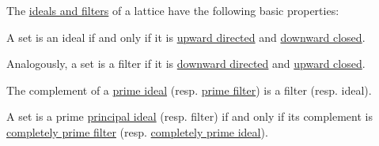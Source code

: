 \begin{proposition}\label{thm:def:lattice_ideal}
  The \hyperref[def:lattice_ideal]{ideals and filters} of a lattice have the following basic properties:
  \begin{thmenum}
     A set is an ideal if and only if it is \hyperref[def:directed_set]{upward directed} and \hyperref[def:closed_ordered_set]{downward closed}.

    Analogously, a set is a filter if it is \hyperref[def:directed_set]{downward directed} and \hyperref[def:closed_ordered_set]{upward closed}.

     The complement of a \hyperref[def:lattice_ideal/prime]{prime ideal} (resp. \hyperref[def:lattice_ideal/prime]{prime filter}) is a filter (resp. ideal).

     A set is a prime \hyperref[def:lattice_ideal/principal]{principal ideal} (resp. filter) if and only if its complement is \hyperref[def:lattice_ideal/prime]{completely prime filter} (resp. \hyperref[def:lattice_ideal/prime]{completely prime ideal}).
  \end{thmenum}
\end{proposition}
